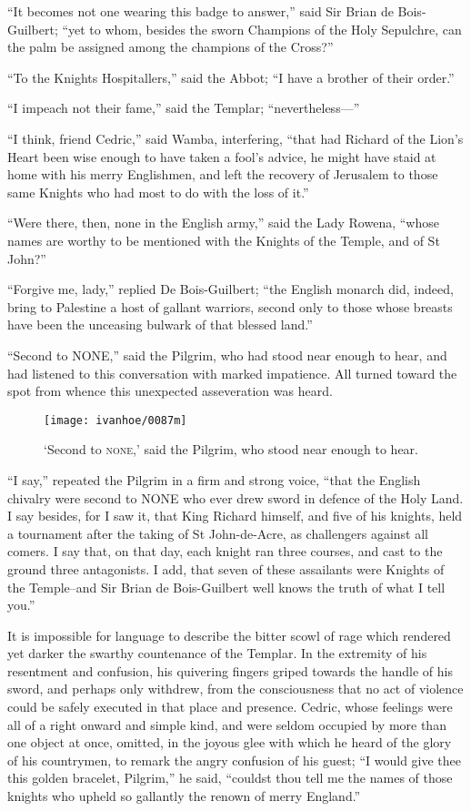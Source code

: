 ``It becomes not one wearing this badge to answer,'' said Sir Brian de
Bois-Guilbert; ``yet to whom, besides the sworn Champions of the Holy
Sepulchre, can the palm be assigned among the champions of the Cross?''

``To the Knights Hospitallers,'' said the Abbot; ``I have a brother of
their order.''

``I impeach not their fame,'' said the Templar; ``nevertheless---''

``I think, friend Cedric,'' said Wamba, interfering, ``that had Richard
of the Lion's Heart been wise enough to have taken a fool's advice, he
might have staid at home with his merry Englishmen, and left the
recovery of Jerusalem to those same Knights who had most to do with the
loss of it.''

``Were there, then, none in the English army,'' said the Lady Rowena,
``whose names are worthy to be mentioned with the Knights of the Temple,
and of St John?''

``Forgive me, lady,'' replied De Bois-Guilbert; ``the English monarch
did, indeed, bring to Palestine a host of gallant warriors, second only
to those whose breasts have been the unceasing bulwark of that blessed
land.''

``Second to NONE,'' said the Pilgrim, who had stood near enough to hear,
and had listened to this conversation with marked impatience. All turned
toward the spot from whence this unexpected asseveration was heard.

\begin{figure}
    \centering
    \texttt{[image: ivanhoe/0087m]}
    \caption{`Second to \textsc{none},' said the Pilgrim, who stood
    near enough to hear.}
\end{figure}

``I say,'' repeated the Pilgrim in a firm and strong voice, ``that the
English chivalry were second to NONE who ever drew sword in defence of
the Holy Land. I say besides, for I saw it, that King Richard himself,
and five of his knights, held a tournament after the taking of St
John-de-Acre, as challengers against all comers. I say that, on that
day, each knight ran three courses, and cast to the ground three
antagonists. I add, that seven of these assailants were Knights of the
Temple--and Sir Brian de Bois-Guilbert well knows the truth of what I
tell you.''

It is impossible for language to describe the bitter scowl of rage which
rendered yet darker the swarthy countenance of the Templar. In the
extremity of his resentment and confusion, his quivering fingers griped
towards the handle of his sword, and perhaps only withdrew, from the
consciousness that no act of violence could be safely executed in that
place and presence. Cedric, whose feelings were all of a right onward
and simple kind, and were seldom occupied by more than one object at
once, omitted, in the joyous glee with which he heard of the glory of
his countrymen, to remark the angry confusion of his guest; ``I would
give thee this golden bracelet, Pilgrim,'' he said, ``couldst thou tell
me the names of those knights who upheld so gallantly the renown of
merry England.''

